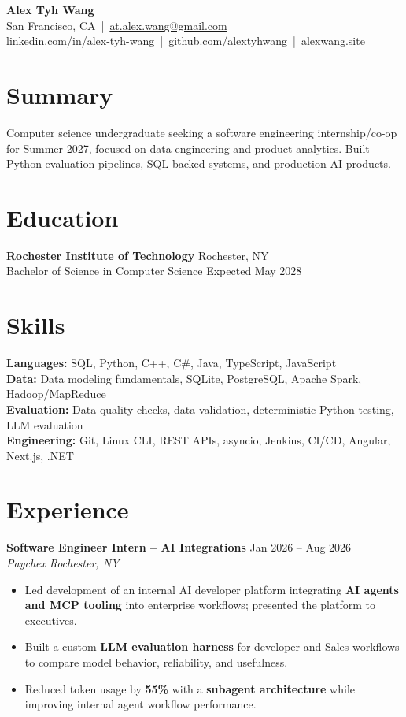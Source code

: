 \documentclass[10pt,letterpaper]{article}
\newif\ifresumeFirstRole
\newcommand{\resumeRole}[4]{%
  \ifresumeFirstRole
    \global\resumeFirstRolefalse
  \else
    \vspace{0pt plus 1fill}%
  \fi
  \textbf{#1} \hfill #2\\
  \textit{#3} \hfill \textit{#4}
}
\begin{document}
\begin{center}
{\Large \textbf{Alex Tyh Wang}}\\
San Francisco, CA \,|\, \href{mailto:at.alex.wang@gmail.com}{at.alex.wang@gmail.com}\\
\small \href{https://www.linkedin.com/in/alex-tyh-wang/}{linkedin.com/in/alex-tyh-wang} \,|\, \href{https://github.com/alextyhwang}{github.com/alextyhwang} \,|\, \href{https://alexwang.site}{alexwang.site}
\end{center}

\section*{Summary}
Computer science undergraduate seeking a software engineering internship/co-op for Summer 2027, focused on data engineering and product analytics. Built Python evaluation pipelines, SQL-backed systems, and production AI products.

\section*{Education}
\textbf{Rochester Institute of Technology} \hfill Rochester, NY\\
Bachelor of Science in Computer Science \hfill Expected May 2028

\section*{Skills}
\textbf{Languages:} SQL, Python, C++, C\#, Java, TypeScript, JavaScript\\
\textbf{Data:} Data modeling fundamentals, SQLite, PostgreSQL, Apache Spark, Hadoop/MapReduce\\
\textbf{Evaluation:} Data quality checks, data validation, deterministic Python testing, LLM evaluation\\
\textbf{Engineering:} Git, Linux CLI, REST APIs, asyncio, Jenkins, CI/CD, Angular, Next.js, .NET

\section*{Experience}
\resumeRole{Software Engineer Intern -- AI Integrations}{Jan 2026 -- Aug 2026}{Paychex}{Rochester, NY}
\begin{itemize}
  \item Led development of an internal AI developer platform integrating \textbf{AI agents and MCP tooling} into enterprise workflows; presented the platform to executives.
  \item Built a custom \textbf{LLM evaluation harness} for developer and Sales workflows to compare model behavior, reliability, and usefulness.
  \item Reduced token usage by \textbf{55\%} with a \textbf{subagent architecture} while improving internal agent workflow performance.
\end{itemize}
\end{document}
